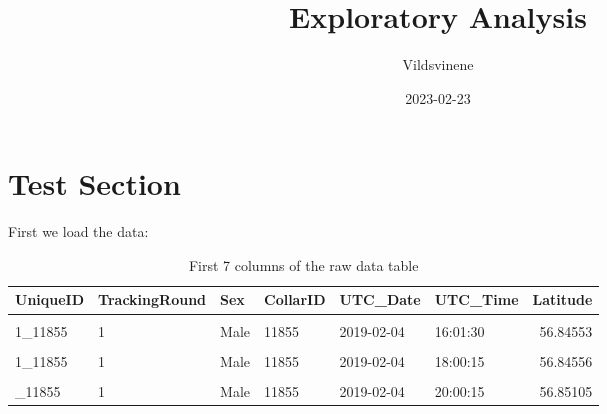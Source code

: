 \documentclass[
]{article}
\title{Exploratory Analysis}
\author{Vildsvinene}
\date{2023-02-23}
\begin{document}
\maketitle

\renewcommand*\contentsname{Table of Contents}
{
\setcounter{tocdepth}{2}
\tableofcontents
}
\hypertarget{test-section}{%
\section{Test Section}\label{test-section}}

First we load the data:

\begin{table}[H]

\caption{\label{tab:unnamed-chunk-1}First 7 columns of the raw data table}
\centering
\begin{tabular}[t]{llllllr}
\toprule
\textbf{UniqueID} & \textbf{TrackingRound} & \textbf{Sex} & \textbf{CollarID} & \textbf{UTC\_Date} & \textbf{UTC\_Time} & \textbf{Latitude}\\
\midrule
\cellcolor{gray!6}{1\_11855} & \cellcolor{gray!6}{1} & \cellcolor{gray!6}{Male} & \cellcolor{gray!6}{11855} & \cellcolor{gray!6}{2019-02-04} & \cellcolor{gray!6}{15:01:57} & \cellcolor{gray!6}{56.84636}\\
1\_11855 & 1 & Male & 11855 & 2019-02-04 & 16:01:30 & 56.84553\\
\cellcolor{gray!6}{1\_11855} & \cellcolor{gray!6}{1} & \cellcolor{gray!6}{Male} & \cellcolor{gray!6}{11855} & \cellcolor{gray!6}{2019-02-04} & \cellcolor{gray!6}{17:00:45} & \cellcolor{gray!6}{56.84657}\\
1\_11855 & 1 & Male & 11855 & 2019-02-04 & 18:00:15 & 56.84556\\
\cellcolor{gray!6}{1\_11855} & \cellcolor{gray!6}{1} & \cellcolor{gray!6}{Male} & \cellcolor{gray!6}{11855} & \cellcolor{gray!6}{2019-02-04} & \cellcolor{gray!6}{19:00:45} & \cellcolor{gray!6}{56.85110}\\
\addlinespace
1\_11855 & 1 & Male & 11855 & 2019-02-04 & 20:00:15 & 56.85105\\
\bottomrule
\end{tabular}
\end{table}
\end{document}
